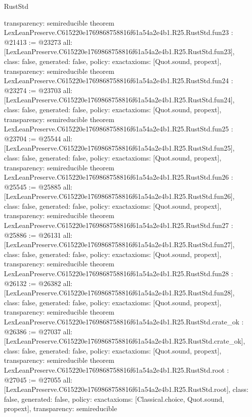 \begin{lexlean}{RustStd}
\begin{coremodule}
{  transparency: semireducible
}
theorem LexLeanPreserve.C615220e1769868758816f61a54a2e4b1.R25.RustStd.fun23 : @21413 := @23273 {
  all: [LexLeanPreserve.C615220e1769868758816f61a54a2e4b1.R25.RustStd.fun23],
  class: false,
  generated: false,
  policy: exact{axioms: [Quot.sound, propext]},
  transparency: semireducible
}
theorem LexLeanPreserve.C615220e1769868758816f61a54a2e4b1.R25.RustStd.fun24 : @23274 := @23703 {
  all: [LexLeanPreserve.C615220e1769868758816f61a54a2e4b1.R25.RustStd.fun24],
  class: false,
  generated: false,
  policy: exact{axioms: [Quot.sound, propext]},
  transparency: semireducible
}
theorem LexLeanPreserve.C615220e1769868758816f61a54a2e4b1.R25.RustStd.fun25 : @23704 := @25544 {
  all: [LexLeanPreserve.C615220e1769868758816f61a54a2e4b1.R25.RustStd.fun25],
  class: false,
  generated: false,
  policy: exact{axioms: [Quot.sound, propext]},
  transparency: semireducible
}
theorem LexLeanPreserve.C615220e1769868758816f61a54a2e4b1.R25.RustStd.fun26 : @25545 := @25885 {
  all: [LexLeanPreserve.C615220e1769868758816f61a54a2e4b1.R25.RustStd.fun26],
  class: false,
  generated: false,
  policy: exact{axioms: [Quot.sound, propext]},
  transparency: semireducible
}
theorem LexLeanPreserve.C615220e1769868758816f61a54a2e4b1.R25.RustStd.fun27 : @25886 := @26131 {
  all: [LexLeanPreserve.C615220e1769868758816f61a54a2e4b1.R25.RustStd.fun27],
  class: false,
  generated: false,
  policy: exact{axioms: [Quot.sound, propext]},
  transparency: semireducible
}
theorem LexLeanPreserve.C615220e1769868758816f61a54a2e4b1.R25.RustStd.fun28 : @26132 := @26382 {
  all: [LexLeanPreserve.C615220e1769868758816f61a54a2e4b1.R25.RustStd.fun28],
  class: false,
  generated: false,
  policy: exact{axioms: [Quot.sound, propext]},
  transparency: semireducible
}
theorem LexLeanPreserve.C615220e1769868758816f61a54a2e4b1.R25.RustStd.crate_ok : @26386 := @27037 {
  all: [LexLeanPreserve.C615220e1769868758816f61a54a2e4b1.R25.RustStd.crate_ok],
  class: false,
  generated: false,
  policy: exact{axioms: [Quot.sound, propext]},
  transparency: semireducible
}
theorem LexLeanPreserve.C615220e1769868758816f61a54a2e4b1.R25.RustStd.root : @27045 := @27055 {
  all: [LexLeanPreserve.C615220e1769868758816f61a54a2e4b1.R25.RustStd.root],
  class: false,
  generated: false,
  policy: exact{axioms: [Classical.choice, Quot.sound, propext]},
  transparency: semireducible
}


\end{coremodule}
\end{lexlean}
